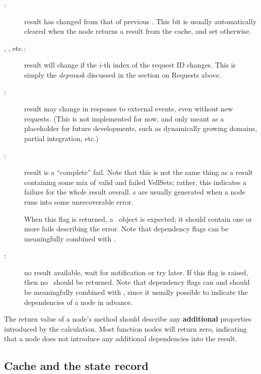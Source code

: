   \begin{description}
  
  \item[:] result has changed from that of previous \Request. This
    bit is usually automatically cleared when the node returns a result 
    from the cache, and set otherwise.
     
  \item[, , etc.:] result will change if the $i$-th
    index of the request ID changes. This is simply the {\em depmask\/} discussed
    in the section on Requests above.

  \item[:] result may change in response to external events,
    even without new requests. (This is not implemented for now, and only meant
    as a placeholder for future developments, such as dynamically growing
    domains, partial integration, etc.)

  \item[:] result is a ``complete'' fail. Note that this is not the
    same thing as a result containing some mix of valid and failed VellSets;
    rather, this indicates a failure for the whole result overall. s
    are usually generated when a node runs into some unrecoverable error.
    
    When this flag is returned, a \Result\ object is expected; it should
    contain one or more fails describing the error. Note that dependency flags
    can be meaningfully combined with .

  \item[:] no result available, wait for notification or try later.
    If this flag is raised, then no \Result\ should be returned. Note that
    dependency flags can and should be meaningfully combined with ,
    since it usually possible to indicate the dependencies of a node in
    advance.

  \end{description}
  
  The return value of a node's  method should describe any {\bf
  additional} properties introduced by the  calculation.
  Most function nodes will
  return zero, indicating that a node does not introduce any additional
  dependencies into the result. 

  \subsection{Cache and the state record}
  

